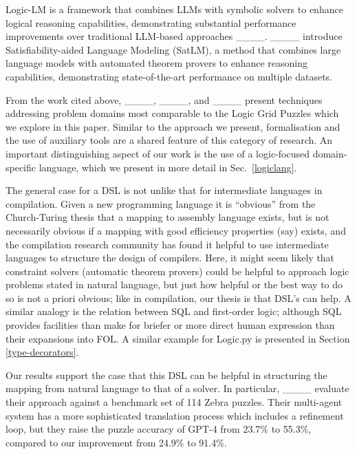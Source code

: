 Logic-LM is a framework that combines LLMs with symbolic solvers to enhance
logical reasoning capabilities, demonstrating substantial performance
improvements over traditional LLM-based approaches ____.
____ introduce
Satisfiability-aided Language Modeling (SatLM), a method that combines large
language models with automated theorem provers to enhance reasoning
capabilities, demonstrating state-of-the-art performance on multiple datasets.

From the work cited above, ____,
____, and
____ present techniques addressing problem
domains most comparable to the Logic Grid Puzzles which we explore in this
paper. Similar to the approach we present, formalisation and the use of
auxiliary tools are a shared feature of this category of research. An important
distinguishing aspect of our work is the use of a logic-focused domain-specific
language, which we present in more detail in Sec.~\ref{logiclang}.

The general case for a DSL is not unlike that for intermediate languages in compilation. Given a new programming language it is ``obvious'' from the Church-Turing thesis that a mapping to assembly language exists, but is not necessarily obvious if a mapping with good efficiency properties (say) exists, and the compilation research community has found it helpful to use intermediate languages to structure the design of compilers. Here, it might seem likely that constraint solvers (automatic theorem provers) could be helpful to approach logic problems stated in natural language, but just how helpful or the best way to do so is not a priori obvious; like in compilation, our thesis is that DSL's can help. A similar analogy is the relation between SQL and first-order logic; although SQL provides facilities than make for briefer or more direct human expression than their expansions into FOL. A similar example for Logic.py is presented in Section \ref{type-decorators}.


Our results
support the case that this DSL can be helpful in structuring the mapping from natural language to that of a solver. In particular, ____ evaluate their
approach against a benchmark set of 114 Zebra puzzles. Their multi-agent system has a more sophisticated translation process which includes a refinement loop, but they
raise the puzzle accuracy of GPT-4 from 23.7\% to 55.3\%, compared to our
improvement from 24.9\% to 91.4\%.